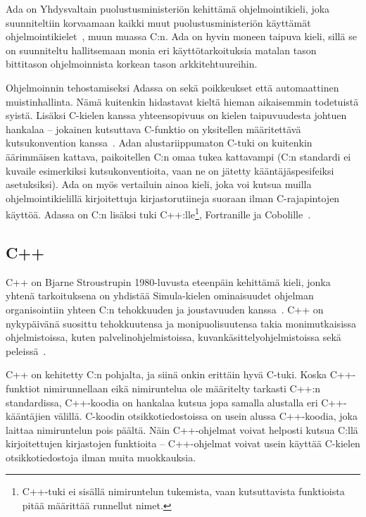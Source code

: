 Ada on Yhdysvaltain puolustusministeriön kehittämä ohjelmointikieli, joka
suunniteltiin korvaamaan kaikki muut puolustusministeriön käyttämät
ohjelmointikielet~\citep{adahistory}, muun muassa C:n. Ada on hyvin moneen
taipuva kieli, sillä se on suunniteltu hallitsemaan monia eri
käyttötarkoituksia matalan tason bittitason ohjelmoinnista korkean tason
arkkitehtuureihin.

Ohjelmoinnin tehostamiseksi Adassa on sekä poikkeukset että automaattinen
muistinhallinta. Nämä kuitenkin hidastavat kieltä hieman aikaisemmin todetuistä
syistä. Lisäksi C-kielen kanssa yhteensopivuus on kielen taipuvuudesta johtuen
hankalaa -- jokainen kutsuttava C-funktio on yksitellen määritettävä
kutsukonvention kanssa~\citep[s.~471]{ADA12}. Adan
alustariippumaton C-tuki on kuitenkin äärimmäisen kattava, paikoitellen C:n
omaa tukea kattavampi (C:n standardi ei kuvaile esimerkiksi kutsukonventioita,
vaan ne on jätetty kään\-tä\-jä\-spesifeiksi asetuksiksi). Ada on myös
vertailuin ainoa kieli, joka voi kutsua muilla ohjelmointikielillä
kirjoitettuja kirjastorutiineja suoraan ilman C-rajapintojen käyttöä. Adassa on
C:n lisäksi tuki C++:lle\footnote{C++-tuki ei sisällä nimiruntelun tukemista,
vaan kutsuttavista funktioista pitää määrittää runnellut nimet.}, Fortranille
ja Cobolille~\citep[s.~585]{ADA12}.

\subsection{C++}

C++ on Bjarne Stroustrupin 1980-luvusta eteenpäin kehittämä kieli, jonka
yhtenä tarkoituksena on yhdistää Simula-kielen ominaisuudet ohjelman
organisointiin yhteen C:n tehokkuuden ja joustavuuden
kanssa~\citep{cpphistory}. C++ on nykypäivänä suosittu tehokkuutensa ja
monipuolisuutensa takia monimutkaisissa ohjelmistoissa, kuten
palvelinohjelmistoissa, kuvankäsittelyohjelmistoissa sekä
peleissä~\citep{cppapps}.

C++ on kehitetty C:n pohjalta, ja siinä onkin erittäin hyvä C-tuki. Koska
C++\hyp{}funktiot nimirunnellaan eikä nimiruntelua ole määritelty tarkasti C++:n
standardissa, C++-koodia on hankalaa kutsua jopa samalla alustalla eri
C++-kääntäjien välillä. C-koodin otsikkotiedostoissa on
usein alussa C++-koodia, joka laittaa nimiruntelun pois päältä. Näin
C++-ohjelmat voivat helposti kutsua C:llä kirjoitettujen kirjastojen funktioita
-- C++-ohjelmat voivat usein käyttää C-kielen otsikkotiedostoja ilman muita
muokkauksia.

